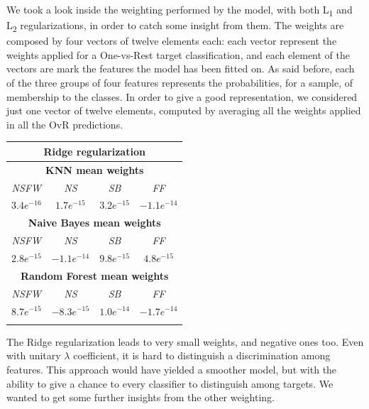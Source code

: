 We took a look inside the weighting performed by the model, with both L\textsubscript{1} and L\textsubscript{2} regularizations, in order to catch some insight from them.
The weights are composed by four vectors of twelve elements each: each vector represent the weights applied for a One-vs-Rest target classification, and each element of the vectors are mark the features the model has been fitted on. As said before, each of the three groups of four features represents the probabilities, for a sample, of membership to the classes.
In order to give a good representation, we considered just one vector of twelve elements, computed by averaging all the weights applied in all the OvR predictions.

\begin{center}
	\begin{tabular}{@{}cccc@{}}
		\multicolumn{4}{c}{Ridge regularization}\\
		\hline\hline
		\multicolumn{4}{c}{\textbf{KNN mean weights}}\\
		\hline
		\multicolumn{1}{c|}{\textit{NSFW}}&
		\multicolumn{1}{c|}{\textit{NS}}&
		\multicolumn{1}{c|}{\textit{SB}}&
		\multicolumn{1}{c}{\textit{FF}}\\
		\hline
		\multicolumn{1}{c|}{$ 3.4e^{-16} $}&
		\multicolumn{1}{c|}{$ 1.7e^{-15} $}&
		\multicolumn{1}{c|}{$ 3.2e^{-15} $}&
		\multicolumn{1}{c}{$ -1.1e^{-14} $}\\
		\hline
		\multicolumn{4}{c}{\textbf{Naive Bayes mean weights}}\\
		\hline
		\multicolumn{1}{c|}{\textit{NSFW}}&
		\multicolumn{1}{c|}{\textit{NS}}&
		\multicolumn{1}{c|}{\textit{SB}}&
		\multicolumn{1}{c}{\textit{FF}}\\
		\hline
		\multicolumn{1}{c|}{$ 2.8e^{-15} $}&
		\multicolumn{1}{c|}{$ -1.1e^{-14} $}&
		\multicolumn{1}{c|}{$ 9.8e^{-15} $}&
		\multicolumn{1}{c}{$ 4.8e^{-15} $}\\
		\hline
		\multicolumn{4}{c}{\textbf{Random Forest mean weights}}\\
		\hline
		\multicolumn{1}{c|}{\textit{NSFW}}&
		\multicolumn{1}{c|}{\textit{NS}}&
		\multicolumn{1}{c|}{\textit{SB}}&
		\multicolumn{1}{c}{\textit{FF}}\\
		\hline
		\multicolumn{1}{c|}{$ 8.7e^{-15} $}&
		\multicolumn{1}{c|}{$ -8.3e^{-15} $}&
		\multicolumn{1}{c|}{$ 1.0e^{-14} $}&
		\multicolumn{1}{c}{$ -1.7e^{-14} $}\\
		\hline\hline\\
	\end{tabular}
\end{center}
The Ridge regularization leads to very small weights, and negative ones too. Even with unitary $ \lambda  $ coefficient, it is hard to distinguish a discrimination among features. This approach would have yielded a smoother model, but with the ability to give a chance to every classifier to distinguish among targets.
We wanted to get some further insights from the other weighting.

